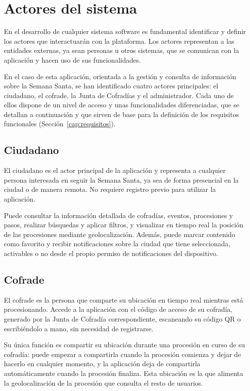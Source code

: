 \section{Actores del sistema}\label{cap:analisis_usuarios}

En el desarrollo de cualquier sistema software es fundamental identificar y definir los actores que interactuarán con la plataforma. Los actores representan a las entidades externas, ya sean personas u otros sistemas, que se comunican con la aplicación y hacen uso de sus funcionalidades.

En el caso de esta aplicación, orientada a la gestión y consulta de información sobre la Semana Santa, se han identificado cuatro actores principales: el ciudadano, el cofrade, la Junta de Cofradías y el administrador. Cada uno de ellos dispone de un nivel de acceso y unas funcionalidades diferenciadas, que se detallan a continuación y que sirven de base para la definición de los requisitos funcionales (Sección~\ref{cap:requisitos}).

\subsection{Ciudadano}

El ciudadano es el actor principal de la aplicación y representa a cualquier persona interesada en seguir la Semana Santa, ya sea de forma presencial en la ciudad o de manera remota. No requiere registro previo para utilizar la aplicación.

Puede consultar la información detallada de cofradías, eventos, procesiones y pasos, realizar búsquedas y aplicar filtros, y visualizar en tiempo real la posición de las procesiones mediante geolocalización. Además, puede marcar contenido como favorito y recibir notificaciones sobre la ciudad que tiene seleccionada, activables o no desde el propio permiso de notificaciones del dispositivo.

\subsection{Cofrade}

El cofrade es la persona que comparte su ubicación en tiempo real mientras está procesionando. Accede a la aplicación con el código de acceso de su cofradía, generado por la Junta de Cofradía correspondiente, escaneando su código QR o escribiéndolo a mano, sin necesidad de registrarse.

Su única función es compartir su ubicación durante una procesión en curso de su cofradía: puede empezar a compartirla cuando la procesión comienza y dejar de hacerlo en cualquier momento, y la aplicación deja de compartirla automáticamente cuando la procesión finaliza. Esta ubicación es la que alimenta la geolocalización de la procesión que consulta el resto de usuarios.

